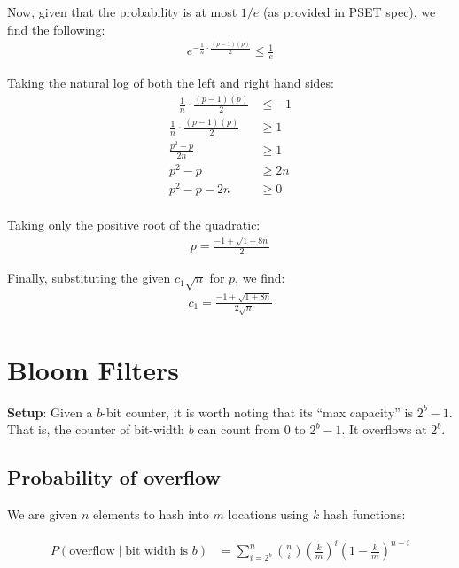 \documentclass[conference]{styles/acmsiggraph}
\newcommand{\?}{\stackrel{?}{=}}
\begin{document}
Now, given that the probability is at most $1/e$ (as provided in PSET spec), we find the following:
\begin{align}\label{eq:LessThan}
    e^{-\frac{1}{n} \cdot \frac{(p-1)(p)}{2}} \leq \frac{1}{e}
\end{align}

Taking the natural log of both the left and right hand sides:
\begin{align}\label{eq:LessThan}
    -\frac{1}{n} \cdot \frac{(p-1)(p)}{2} & \leq -1 \\
    \frac{1}{n} \cdot \frac{(p-1)(p)}{2}  & \geq 1 \\
    \frac{p^2 - p}{2n}  & \geq 1 \\
    p^2 - p & \geq 2n \\
    p^2 - p - 2n & \geq 0 \\
\end{align}

Taking only the positive root of the quadratic:
\begin{align}
    p = \frac{-1 + \sqrt{1 + 8n}}{2}
\end{align}

Finally, substituting the given $c_1 \sqrt{n}$ for $p$, we find:
\begin{align}
    c_1 = \frac{-1 + \sqrt{1 + 8n}}{2\sqrt{n}}
\end{align}

\newpage

\section{Bloom Filters}
\textbf{Setup}:
Given a $b$-bit counter, it is worth noting that its \enquote{max capacity} is $2^b - 1$.  That is, the counter of bit-width $b$ can count from $0$ to $2^b - 1$.  It overflows at $2^b$.

\subsection{Probability of overflow}
We are given $n$ elements to hash into $m$ locations using $k$ hash functions:

\begin{align} \label{eq:badProb}
    P(\text{overflow} \mid \text{bit width is } b) &= \sum_{i = 2^b}^{n} {n \choose i} \left( \frac{k}{m}\right )^i \left( 1 - \frac{k}{m} \right) ^{n-i}
\end{align}
\end{document}
